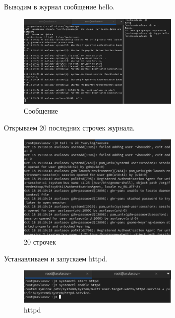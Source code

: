 \documentclass[
  12pt,
  a4paper,
  DIV=11,
  numbers=noendperiod]{scrreprt}
\begin{document}
Выводим в журнал сообщение hello.

\begin{figure}

{\centering \includegraphics[width=0.7\textwidth,height=\textheight]{image/2.png}

}

\caption{Сообщение}

\end{figure}%

Открываем 20 последних строчек журнала.

\begin{figure}

{\centering \includegraphics[width=0.7\textwidth,height=\textheight]{image/3.png}

}

\caption{20 строчек}

\end{figure}%

Устанавливаем и запускаем httpd.

\begin{figure}

{\centering \includegraphics[width=0.7\textwidth,height=\textheight]{image/4.png}

}

\caption{httpd}

\end{figure}%
\end{document}
